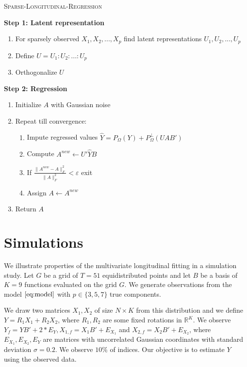 \documentclass[preprint]{imsart}
\numberwithin{equation}{section}
\theoremstyle{plain}
\newcommand{\R}{\mathbb{R}}
\DeclareMathOperator*{\diag}{diag}
\begin{document}
\begin{algorithm}
\caption{\textsc{Sparse-Longitudinal-Regression}\label{alg:sparse-regression}}
\vspace{3pt}
\begin{flushleft}
\textbf{Step 1: Latent representation}
\end{flushleft}
\begin{enumerate}
\item For sparsely observed $X_1,X_2,...,X_p$ find latent representations $U_1,U_2,...,U_p$
\item Define $U = U_1:U_2:...:U_p$
\item Orthogonalize $U$
\end{enumerate}
\begin{flushleft}
\textbf{Step 2: Regression}
\end{flushleft}
\begin{enumerate}
\item Initialize $A$ with Gaussian noise
\item Repeat till convergence:
\begin{enumerate}
\item Impute regressed values $\hat{Y} = P_\Omega(Y) + P_\Omega^\perp(UAB')$
\item Compute $A^{new} \leftarrow U'\hat{Y}B$
\item If $\frac{\|A^{new} - A\|_F^2}{\|A\|_F^2} < \varepsilon$ exit
\item Assign $A \leftarrow A^{new}$
\end{enumerate}
\item Return $A$
\end{enumerate}
\end{algorithm}


\section{Simulations}\label{s:simulation}

We illustrate properties of the multivariate longitudinal fitting in a simulation study. Let $G$ be a grid of $T = 51$ equidistributed points and let $B$ be a basis of $K = 9$ functions evaluated on the grid $G$. We generate observations from the model $\eqref{eq:model}$ with $p \in \{3,5,7\}$ true components. %

We draw two matrices $X_1,X_2$ of size $N \times K$ from this distribution and we define $Y = R_1 X_1 + R_2 X_2$, where $R_1,R_2$ are some fixed rotations in $\R^K$. We observe $Y_f = YB' + 2* E_Y, X_{1,f} = X_1B' + E_{X_1}$ and $X_{2,f} = X_2 B' + E_{X_2}$, where $E_{X_1},E_{X_2},E_{Y}$ are matrices with uncorrelated Gaussian coordinates with standard deviation $\sigma = 0.2$. We observe $10\%$ of indices. Our objective is to estimate $Y$ using the observed data.
\end{document}
